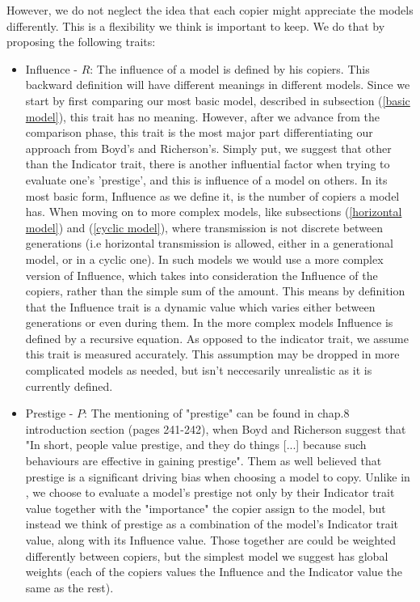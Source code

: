 \documentclass[11pt]{article}
\begin{document}
  However, we do not neglect the idea that each copier might appreciate the models differently. This is a flexibility we think is important to keep. We do that by proposing the following traits:
  
   \begin{itemize}
   \item Influence - $R$: The influence of a model is defined by his copiers. This backward definition will have different meanings in different models. Since we start by first comparing our most basic model, described in subsection (\ref{basic model}), this trait has no meaning. However, after we advance from the comparison phase, this trait is the most major part differentiating our approach from Boyd's and Richerson's. Simply put, we suggest that other than the Indicator trait, there is another influential factor when trying to evaluate one's 'prestige', and this is influence of a model on others. In its most basic form, Influence as we define it, is the number of copiers a model has. When moving on to more complex models, like subsections (\ref{horizontal model}) and (\ref{cyclic model}), where transmission is not discrete between generations (i.e horizontal transmission is allowed, either in a generational model, or in a cyclic one). In such models we would use a more complex version of Influence, which takes into consideration the Influence of the copiers, rather than the simple sum of the amount. This means by definition that the Influence trait is a dynamic value which varies either between generations or even during them. In the more complex models Influence is defined by a recursive equation.
   As opposed to the indicator trait, we assume this trait is measured accurately. This assumption may be dropped in more complicated models as needed, but isn't neccesarily unrealistic as it is currently defined.
  \item Prestige - $P$: The mentioning of "prestige" can be found in \cite{evolutionBook} chap.8 introduction section (pages 241-242), when Boyd and Richerson suggest that "In short, people value prestige, and they do things [...] because such behaviours are effective in gaining prestige". Them as well believed that prestige is a significant driving bias when choosing a model to copy. Unlike in \cite{evolutionBook}, we choose to evaluate a model's prestige not only by their Indicator trait value together with the "importance" the copier assign to the model, but instead we think of prestige as a combination of the model's Indicator trait value, along with its Influence value. Those together are could be weighted differently between copiers, but the simplest model we suggest has global weights (each of the copiers values the Influence and the Indicator value the same as the rest).
\end{itemize}
\end{document}
